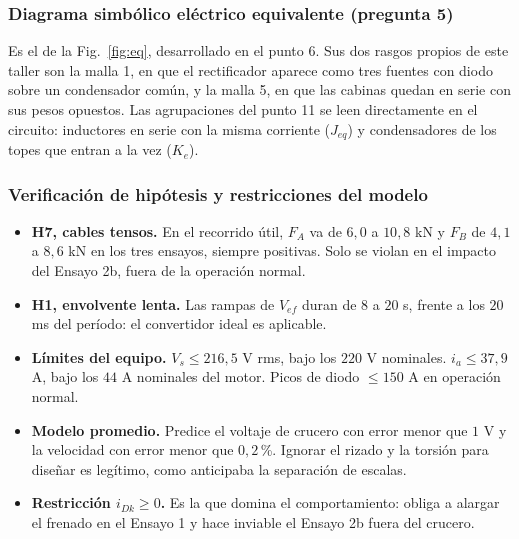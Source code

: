 \documentclass[10pt,a4paper,twocolumn]{article}
\begin{document}
\subsubsection*{Diagrama simbólico eléctrico equivalente (pregunta 5)}

Es el de la Fig.~\ref{fig:eq}, desarrollado en el punto 6. Sus dos rasgos propios de este
taller son la malla 1, en que el rectificador aparece como tres fuentes con diodo sobre un
condensador común, y la malla 5, en que las cabinas quedan en serie con sus pesos opuestos.
Las agrupaciones del punto 11 se leen directamente en el circuito: inductores en serie con
la misma corriente ($J_{eq}$) y condensadores de los topes que entran a la vez ($K_e$).

\subsubsection*{Verificación de hipótesis y restricciones del modelo}

\begin{itemize}
  \item \textbf{H7, cables tensos.} En el recorrido útil, $F_A$ va de $6{,}0$ a $10{,}8$ kN
        y $F_B$ de $4{,}1$ a $8{,}6$ kN en los tres ensayos, siempre positivas. Solo se
        violan en el impacto del Ensayo 2b, fuera de la operación normal.
  \item \textbf{H1, envolvente lenta.} Las rampas de $V_{ef}$ duran de $8$ a $20$ s, frente
        a los $20$ ms del período: el convertidor ideal es aplicable.
  \item \textbf{Límites del equipo.} $V_s \le 216{,}5$ V rms, bajo los $220$ V nominales.
        $i_a\le 37{,}9$ A, bajo los $44$ A nominales del motor. Picos de diodo $\le 150$ A
        en operación normal.
  \item \textbf{Modelo promedio.} Predice el voltaje de crucero con error menor que $1$ V
        y la velocidad con error menor que $0{,}2$\,\%. Ignorar el rizado y la torsión para
        diseñar es legítimo, como anticipaba la separación de escalas.
  \item \textbf{Restricción $i_{Dk}\ge0$.} Es la que domina el comportamiento: obliga a
        alargar el frenado en el Ensayo 1 y hace inviable el Ensayo 2b fuera del crucero.
\end{itemize}
\end{document}
